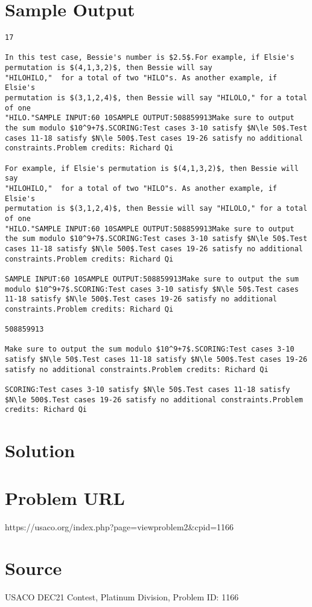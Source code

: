 \documentclass[12pt]{article}
\begin{document}
\section*{Sample Output}
\begin{verbatim}
17

In this test case, Bessie's number is $2.5$.For example, if Elsie's permutation is $(4,1,3,2)$, then Bessie will say
"HILOHILO,"  for a total of two "HILO"s. As another example, if Elsie's
permutation is $(3,1,2,4)$, then Bessie will say "HILOLO," for a total of one
"HILO."SAMPLE INPUT:60 10SAMPLE OUTPUT:508859913Make sure to output the sum modulo $10^9+7$.SCORING:Test cases 3-10 satisfy $N\le 50$.Test cases 11-18 satisfy $N\le 500$.Test cases 19-26 satisfy no additional constraints.Problem credits: Richard Qi

For example, if Elsie's permutation is $(4,1,3,2)$, then Bessie will say
"HILOHILO,"  for a total of two "HILO"s. As another example, if Elsie's
permutation is $(3,1,2,4)$, then Bessie will say "HILOLO," for a total of one
"HILO."SAMPLE INPUT:60 10SAMPLE OUTPUT:508859913Make sure to output the sum modulo $10^9+7$.SCORING:Test cases 3-10 satisfy $N\le 50$.Test cases 11-18 satisfy $N\le 500$.Test cases 19-26 satisfy no additional constraints.Problem credits: Richard Qi

SAMPLE INPUT:60 10SAMPLE OUTPUT:508859913Make sure to output the sum modulo $10^9+7$.SCORING:Test cases 3-10 satisfy $N\le 50$.Test cases 11-18 satisfy $N\le 500$.Test cases 19-26 satisfy no additional constraints.Problem credits: Richard Qi

508859913

Make sure to output the sum modulo $10^9+7$.SCORING:Test cases 3-10 satisfy $N\le 50$.Test cases 11-18 satisfy $N\le 500$.Test cases 19-26 satisfy no additional constraints.Problem credits: Richard Qi

SCORING:Test cases 3-10 satisfy $N\le 50$.Test cases 11-18 satisfy $N\le 500$.Test cases 19-26 satisfy no additional constraints.Problem credits: Richard Qi
\end{verbatim}

\section*{Solution}


\section*{Problem URL}
https://usaco.org/index.php?page=viewproblem2&cpid=1166

\section*{Source}
USACO DEC21 Contest, Platinum Division, Problem ID: 1166
\end{document}
